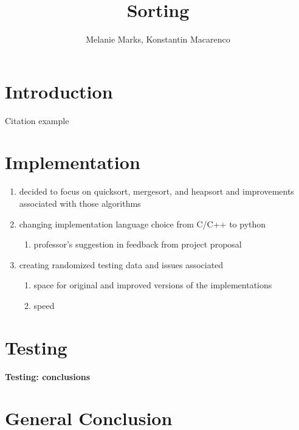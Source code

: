 \documentclass{IEEEtran}
\title{Sorting}
\author{
    Melanie Marks, Konstantin Macarenco\\
}
\begin{document}
\maketitle
\thispagestyle{plain}
\pagestyle{plain}
\begin{abstract}

\end{abstract}
\tableofcontents
\section{Introduction}\label{sec:intro}
Citation example\cite{ABOOK}

\pagebreak
\section{Implementation}\label{sec:Implementation}
\begin{enumerate}
\item decided to focus on quicksort, mergesort, and heapsort and improvements associated with those algorithms
\item changing implementation language choice from C/C++ to python
\begin{enumerate}
\item professor's suggestion in feedback from project proposal
\end{enumerate}
\item creating randomized testing data and issues associated
\begin{enumerate}
\item space for original and improved versions of the implementations
\item speed
\end{enumerate}
\end{enumerate}

\pagebreak
\section{Testing}\label{sec:testing}

\textbf{Testing: conclusions}


\pagebreak
\section{General Conclusion}
\end{document}
